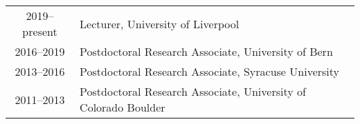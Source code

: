 \documentclass[10 pt]{article}
\newenvironment{tightlistout}
  {\begin{list} {} {\setlength{\topsep}{-8 pt} \setlength{\itemsep}{-3 pt} \setlength{\leftmargin}{0 mm}}}{\end{list}}
\newcommand{\blankline}{\quad\pagebreak[2]}
\newcommand{\spacer}{\blankline\vspace{12 pt}\blankline}
\begin{document}
\vspace{-12 pt} %
\begin{tabular}[t]{cl}
  2019--present & Lecturer, University of Liverpool                               \\
  2016--2019    & Postdoctoral Research Associate, University of Bern             \\
  2013--2016    & Postdoctoral Research Associate, Syracuse University            \\
  2011--2013    & Postdoctoral Research Associate, University of Colorado Boulder \\
\end{tabular}

\spacer

\begin{comment}
Syracuse University, Syracuse NY
\begin{tightlistout}
  \item Postdoctoral Research Associate \hfill since September 2013%
  \item ---Supported by DOE \href{http://www.scidac.gov}{Scientific Discovery through Advanced Computing} (SciDAC) program
  \item ---Research focused on lattice studies of strongly interacting supersymmetric systems
  \item ---Helped mentor graduate students Aarti Veernala and Raghav Jha
  \item ---Organized weekly \href{http://web.physics.syr.edu/events/2015-16-List-SEM-het-rel.html}{theory seminars} and informal \href{http://dschaich.expressions.syr.edu/theory-meeting/}{particle theory meetings}
\end{tightlistout}

\blankline


\end{comment}
\end{document}
